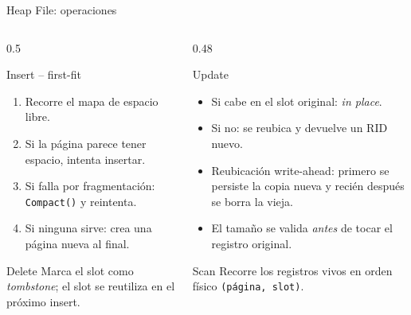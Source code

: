 \documentclass[aspectratio=169,10pt]{beamer}
\begin{document}
\begin{frame}{Heap File: operaciones}
  \begin{columns}[T]
    \begin{column}{0.5\textwidth}
      \begin{block}{Insert \;--\; first-fit}
        \small
        \begin{enumerate}
          \item Recorre el mapa de espacio libre.
          \item Si la página parece tener espacio, intenta insertar.
          \item Si falla por fragmentación: \texttt{Compact()} y reintenta.
          \item Si ninguna sirve: crea una página nueva al final.
        \end{enumerate}
      \end{block}
      \begin{block}{Delete}
        \small Marca el slot como \emph{tombstone}; el slot se reutiliza en el próximo insert.
      \end{block}
    \end{column}
    \begin{column}{0.48\textwidth}
      \begin{block}{Update}
        \small
        \begin{itemize}
          \item Si cabe en el slot original: \emph{in place}.
          \item Si no: se reubica y devuelve un RID nuevo.
          \item Reubicación \alert{write-ahead}: primero se persiste la copia nueva y recién después se borra la vieja.
          \item El tamaño se valida \emph{antes} de tocar el registro original.
        \end{itemize}
      \end{block}
      \begin{block}{Scan}
        \small Recorre los registros vivos en orden físico \texttt{(página, slot)}.
      \end{block}
    \end{column}
  \end{columns}
\end{frame}
\end{document}
